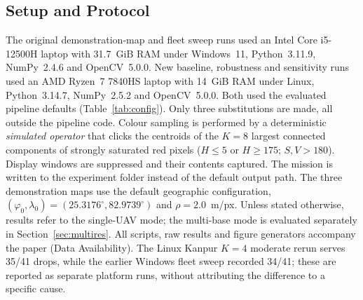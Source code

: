\subsection{Setup and Protocol}
The original demonstration-map and fleet sweep runs used an Intel Core i5-12500H laptop with 31.7~GiB RAM under Windows~11, Python~3.11.9, NumPy~2.4.6 and OpenCV~5.0.0. New baseline, robustness and sensitivity runs used an AMD Ryzen~7 7840HS laptop with 14~GiB RAM under Linux, Python~3.14.7, NumPy~2.5.2 and OpenCV~5.0.0. Both used the evaluated pipeline defaults (Table~\ref{tab:config}). Only three substitutions are made, all outside the pipeline code. Colour sampling is performed by a deterministic \emph{simulated operator} that clicks the centroids of the $K=8$ largest connected components of strongly saturated red pixels ($H\le5$ or $H\ge175$; $S,V>180$). Display windows are suppressed and their contents captured. The mission is written to the experiment folder instead of the default output path. The three demonstration maps use the default geographic configuration, $(\varphi_0,\lambda_0)=(25.3176^\circ,82.9739^\circ)$ and $\rho=2.0$~m/px. Unless stated otherwise, results refer to the single-UAV mode; the multi-base mode is evaluated separately in Section~\ref{sec:multires}. All scripts, raw results and figure generators accompany the paper (Data Availability). The Linux Kanpur $K=4$ moderate rerun serves 35/41 drops, while the earlier Windows fleet sweep recorded 34/41; these are reported as separate platform runs, without attributing the difference to a specific cause.

